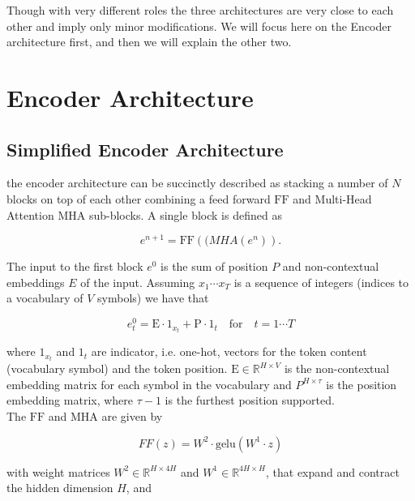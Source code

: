 Though with very different roles the three architectures are very close to each other and imply only minor modifications. We will focus here on the Encoder architecture first, and then we will explain the other two.

\section{Encoder Architecture}

\subsection{Simplified Encoder Architecture}

the encoder architecture can be succinctly described as stacking a number of $N$ blocks on top of each other combining a feed forward $\mathrm{FF}$ and Multi-Head Attention $\mathrm{MHA}$ sub-blocks. A single block is defined as

\begin{equation}
e^{n+1} = \mathrm{FF}(\mathrm(MHA(e^n)).
\end{equation}

The input to the first block $e^0$ is the sum of position $P$ and non-contextual embeddings $E$ of the input. Assuming $x_1 \cdots x_T$ is a sequence of integers (indices to a vocabulary of $V$ symbols) we have that

\begin{equation}
e^{0}_t = \mathrm{E} \cdot \mathrm{1}_{x_t} + \mathrm{P} \cdot \mathrm{1}_t \quad \mbox{for} \quad t=1 \cdots T
\end{equation}

where $\mathrm{1}_{x_t}$ and $\mathrm{1}_t$ are indicator, i.e. one-hot, vectors for the token content (vocabulary symbol) and the token position. $\mathrm{E} \in \mathbb{R}^{H \times V}$ is the non-contextual embedding matrix for each symbol in the vocabulary and $P^{H \times \tau}$ is the position embedding matrix, where  $\tau-1$ is the furthest position supported.\\

\noindent The $\mathrm{FF}$ and $\mathrm{MHA}$ are given by

\begin{equation}
FF(z) = W^2\cdot \mathrm{gelu}(W^1 \cdot z)
\end{equation}

\noindent with weight matrices $W^2 \in \mathbb{R}^{H \times 4H}$ and $W^1 \in \mathbb{R}^{4H \times H}$, that expand and contract the hidden dimension $H$, and

